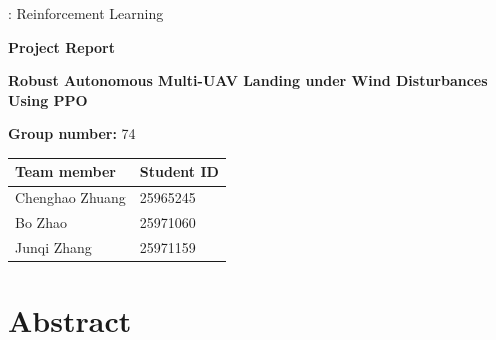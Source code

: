 \documentclass[11pt,a4paper]{article}
\begin{document}
\begin{titlepage}
\hypersetup{pageanchor=false}\thispagestyle{empty}\vspace*{18mm}
{\Large{}: Reinforcement Learning\par}\vspace{12mm}
{\Huge\sffamily\bfseries Project Report\par}\vspace{12mm}
{\LARGE\sffamily\bfseries Robust Autonomous Multi-UAV Landing under Wind Disturbances Using PPO\par}\vspace{14mm}
{\large\textbf{Group number:} 74\par}\vspace{10mm}
\begin{tabularx}{\textwidth}{@{}XX@{}}
\toprule\textbf{Team member}&\textbf{Student ID}\\\midrule
Chenghao Zhuang&25965245\\[5pt]
Bo Zhao&25971060\\[5pt]
Junqi Zhang&25971159\\\bottomrule
\end{tabularx}
\end{titlepage}
\hypersetup{pageanchor=true}\tableofcontents\clearpage
{}\section*{Abstract}
{\small}\clearpage
{}\clearpage
{}\renewcommand{\refname}{\thesection\quad References}
\clearpage
\appendix
\end{document}

